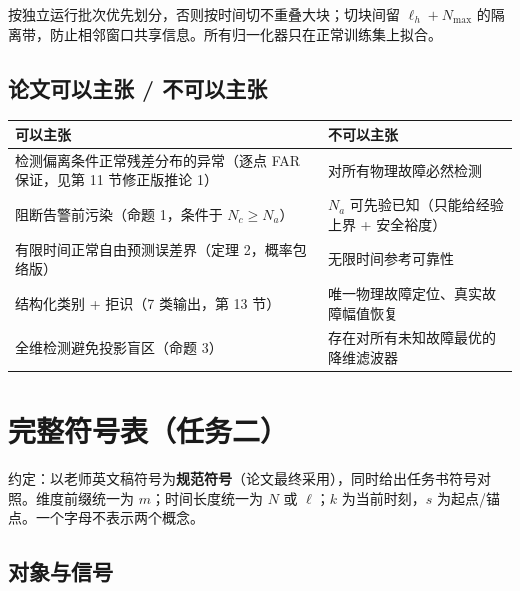 \documentclass[11pt,a4paper]{ctexart}
\theoremstyle{remark}
\begin{document}
按独立运行批次优先划分，否则按时间切不重叠大块；切块间留 $\ell_h+N_{\max}$ 的隔离带，防止相邻窗口共享信息。所有归一化器只在正常训练集上拟合。

\subsection{论文可以主张 / 不可以主张}

\begin{center}
\begin{tabular}{p{}p{}}
\toprule
可以主张 & 不可以主张 \\
\midrule
检测偏离条件正常残差分布的异常（逐点 FAR 保证，见第 11 节修正版推论 1） & 对所有物理故障必然检测 \\
阻断告警前污染（命题 1，条件于 $N_c\ge N_a$） & $N_a$ 可先验已知（只能给经验上界 + 安全裕度） \\
有限时间正常自由预测误差界（定理 2，概率包络版） & 无限时间参考可靠性 \\
结构化类别 + 拒识（7 类输出，第 13 节） & 唯一物理故障定位、真实故障幅值恢复 \\
全维检测避免投影盲区（命题 3） & 存在对所有未知故障最优的降维滤波器 \\
\bottomrule
\end{tabular}
\end{center}

\section{完整符号表（任务二）}

约定：以老师英文稿符号为\textbf{规范符号}（论文最终采用），同时给出任务书符号对照。维度前缀统一为 $m$；时间长度统一为 $N$ 或 $\ell$；$k$ 为当前时刻，$s$ 为起点/锚点。一个字母不表示两个概念。

\subsection{对象与信号}
\end{document}
